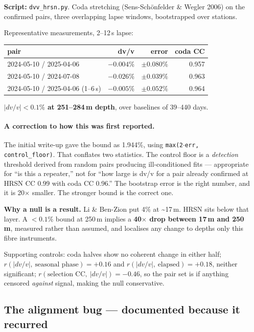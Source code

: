\documentclass[11pt]{article}
\begin{document}
\textbf{Script:} \texttt{dvv\_hrsn.py}. Coda stretching (Sens-Sch\"onfelder \&
Wegler 2006) on the confirmed pairs, three overlapping lapse windows, bootstrapped
over stations.

Representative measurements, 2--12\,s lapse:

\begin{table}[H]
\centering
\begin{tabular}{lrrr}
\toprule
pair & dv/v & error & coda CC \\
\midrule
2024-05-10 / 2025-04-06 & $-0.004\%$ & $\pm0.080\%$ & 0.957 \\
2024-05-10 / 2024-07-08 & $-0.026\%$ & $\pm0.039\%$ & 0.963 \\
2024-05-10 / 2025-04-06 (1--6\,s) & $-0.005\%$ & $\pm0.052\%$ & 0.964 \\
\bottomrule
\end{tabular}
\end{table}

\textbf{$|dv/v| < 0.1\%$ at 251--284\,m depth}, over baselines of 39--440 days.

\paragraph{A correction to how this was first reported.} The initial write-up gave
the bound as 1.944\%, using \texttt{max(2$\cdot$err, control\_floor)}. That
conflates two statistics. The control floor is a \emph{detection} threshold derived
from random pairs producing ill-conditioned fits --- appropriate for ``is this a
repeater,'' not for ``how large is dv/v for a pair already confirmed at HRSN CC
0.99 with coda CC 0.96.'' The bootstrap error is the right number, and it is
20$\times$ smaller. The stronger bound is the correct one.

\textbf{Why a null is a result.} Li \& Ben-Zion put 4\% at \textasciitilde17\,m.
HRSN sits below that layer. A $<0.1\%$ bound at 250\,m implies a \textbf{40$\times$
drop between 17\,m and 250\,m}, measured rather than assumed, and localises any
change to depths only this fibre instruments.

Supporting controls: coda halves show no coherent change in either half;
$r(|dv/v|,\ \text{seasonal phase}) = +0.16$ and $r(|dv/v|,\ \text{elapsed}) = +0.18$,
neither significant; $r(\text{selection CC},\ |dv/v|) = -0.46$, so the pair set is
if anything censored \emph{against} signal, making the null conservative.

\subsection{The alignment bug --- documented because it recurred}
\end{document}
